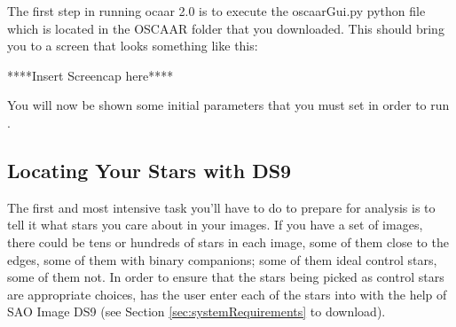 \documentclass[a4paper]{article}
\begin{document}
The first step in running ocaar 2.0 is to execute the oscaarGui.py python file which is located in the OSCAAR folder that you downloaded. This should bring you to a screen that looks something like this:

****Insert Screencap here****

You will now be shown some initial parameters that you must set in order to run \oscaar.


\subsection{Locating Your Stars with DS9}

The first and most intensive task you'll have to do to prepare \oscaar  for analysis is to tell it what stars you care about in your images. If you have a set of images, there could be tens or hundreds of stars in each image, some of them close to the edges, some of them with binary companions; some of them ideal control stars, some of them not. In order to ensure that the stars being picked as control stars are appropriate choices, \oscaar has the user enter each of the stars into \oscaar with the help of SAO Image DS9 (see Section \ref{sec:systemRequirements} to download). 
\end{document}
